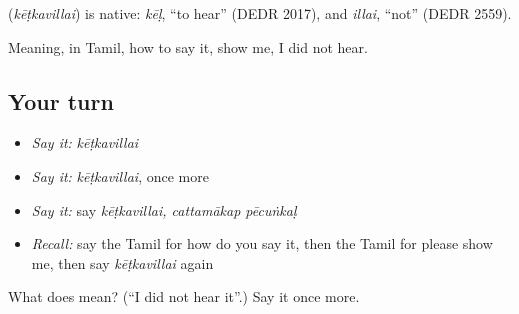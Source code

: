 \begin{cousinweb}
\textbf{} (\emph{kēṭkavillai}) is native: \emph{kēḷ}, \textquotedblleft{}to hear\textquotedblright{} (DEDR 2017), and \emph{illai}, \textquotedblleft{}not\textquotedblright{} (DEDR 2559).
\end{cousinweb}

\begin{grammarlens}[title={What you've built}]
Meaning, in Tamil, how to say it, show me, I did not hear.
\end{grammarlens}

\subsection*{Your turn}
\begin{itemize}
\raggedright
  \item \emph{Say it:} \emph{kēṭkavillai}
  \item \emph{Say it:} \emph{kēṭkavillai}, once more
  \item \emph{Say it:} say \emph{kēṭkavillai, cattamākap pēcuṅkaḷ}
  \item \emph{Recall:} say the Tamil for how do you say it, then the Tamil for please show me, then say \emph{kēṭkavillai} again
\end{itemize}

\begin{tcolorbox}[breakable,colback=teal!4,colframe=teal!35!black,title={Before you move on}]
What does  mean? (\textquotedblleft{}I did not hear it\textquotedblright{}.) Say it once more.
\end{tcolorbox}
